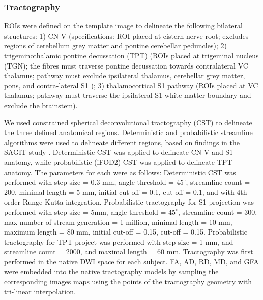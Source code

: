 \subsubsection{Tractography}
ROIs were defined on the template image to delineate the following bilateral structures: 1) CN V (specifications: ROI placed at cistern nerve root; excludes regions of cerebellum grey matter and pontine cerebellar peduncles); 2) trigeminothalamic pontine decussation (TPT) (ROIs placed at trigeminal nucleus (TGN); the fibres must traverse pontine decussation towards contralateral VC thalamus; pathway must exclude ipsilateral thalamus, cerebellar grey matter, pons, and contra-lateral S1 ); 3) thalamocortical S1 pathway (ROIs placed at VC thalamus; pathway must traverse the ipsilateral S1 white-matter boundary and exclude the brainstem).  

We used constrained spherical deconvolutional tractography (CST) \cite{Tournier2012b} to delineate the three defined anatomical regions. Deterministic and probabilistic streamline algorithms were used to delineate different regions, based on findings in the SAGIT study \cite{Chen2016}. Deterministic CST was applied to delineate CN V and S1 anatomy, while probabilistic (iFOD2) CST \cite{Jeurissen2011b,Tournier2010} was applied to delineate TPT anatomy. The parameters for each were as follows: Deterministic CST was performed with step size = 0.3 mm, angle threshold = $45^\circ$, streamline count = 200, minimal length = 5 mm, initial cut-off = 0.1, cut-off = 0.1, and with 4th-order Runge-Kutta integration. Probabilistic tractography for S1 projection was performed with step size = 5mm, angle threshold = $45^\circ$, streamline count = 300, max number of stream generation = 1 million, minimal length = 10 mm, maximum length = 80 mm, initial cut-off = 0.15, cut-off = 0.15. Probabilistic tractography for TPT project was performed with step size = 1 mm, and streamline count = 2000, and maximal length = 60 mm. Tractography was first performed in the native DWI space for each subject.  FA, AD, RD, MD, and GFA were embedded into the native tractography models by sampling the corresponding images maps using the points of the tractography geometry with tri-linear interpolation.

